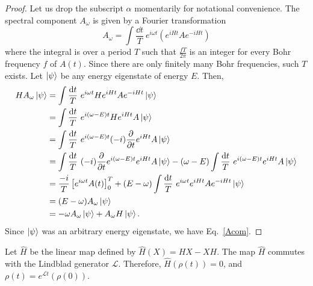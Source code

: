 \begin{proof}
Let us drop the subscript $\alpha$ momentarily for notational convenience.
The spectral component $A_\omega$ is given by a Fourier transformation
\[
 A_\omega = \int \frac{\dd t}{T} \ e^{i \omega t} \left( e^{i H t} A e^{-i H t} \right)
\]
where the integral is over a period $T$ such that $\frac{f T}{2\pi}$ is an integer for every Bohr frequency $f$ of $A(t)$.
Since there are only finitely many Bohr frequencies, such $T$ exists.
Let $\left| {\psi} \right\rangle$ be any energy eigenstate of energy $E$.
Then,
\begin{align*}
 H A_\omega \left| {\psi} \right\rangle 
&= \int \frac{\mathrm{d} t}{T} \ e^{i \omega t} H e^{i H t} A e^{-i H t} \left| {\psi} \right\rangle \\
&= \int \frac{\mathrm{d} t}{T} \ e^{i (\omega-E) t} H e^{i H t} A \left| {\psi} \right\rangle \\
&= \int \frac{\mathrm{d} t}{T} \ e^{i (\omega-E) t} (-i)\frac{\partial}{\partial t} e^{i H t} A \left| {\psi} \right\rangle \\
&= \int \frac{\mathrm{d} t}{T} \ (-i)\frac{\partial}{\partial t} e^{i (\omega-E) t}  e^{i H t} A \left| {\psi} \right\rangle 
      -(\omega-E) \int \frac{\mathrm{d} t}{T} \ e^{i (\omega-E) t}  e^{i H t} A \left| {\psi} \right\rangle  \\
&= \frac{-i}{T} \left[ e^{i \omega t} A(t) \right]_0^T 
   + (E-\omega) \int \frac{\mathrm{d} t}{T} \ e^{i \omega t} e^{i H t} A e^{-i H t} \left| {\psi} \right\rangle \\
&= (E-\omega) A_\omega \left| {\psi} \right\rangle \\
&= -\omega A_\omega \left| {\psi} \right\rangle + A_\omega H \left| {\psi} \right\rangle.
\end{align*}
Since $\left| {\psi} \right\rangle$ was an arbitrary energy eigenstate, we have Eq.~\eqref{Acom}.
\end{proof}
\begin{prop}
\label{prop:com}
Let $\hat{H}$ be the linear map defined by $\hat{H}(X)=HX-XH$.
The map $\hat{H}$ commutes with the Lindblad generator $\mathcal L$.
Therefore, $\hat H (\rho(t)) = 0$, and $\rho(t)=e^{\mathcal L t}(\rho(0))$.
\end{prop}
